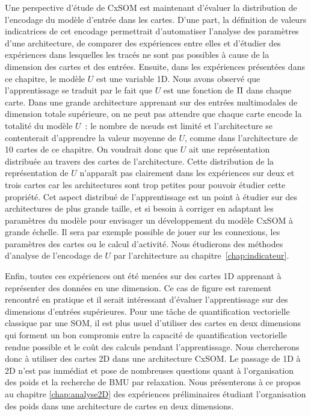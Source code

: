 \documentclass[../main]{subfiles}
\begin{document}
Une perspective d'étude de CxSOM est maintenant d'évaluer la distribution de l'encodage du modèle d'entrée dans les cartes. 
D'une part, la définition de valeurs indicatrices de cet encodage permettrait d'automatiser l'analyse des paramètres d'une architecture, de comparer des expériences entre elles et d'étudier des expériences dans lesquelles les tracés ne sont pas possibles à cause de la dimension des cartes et des entrées.
Ensuite, dans les expériences présentées dans ce chapitre, le modèle $U$ est une variable 1D. 
Nous avons observé que l'apprentissage se traduit par le fait que $U$ est une fonction de $\Pi$ dans chaque carte.
Dans une grande architecture apprenant sur des entrées multimodales de dimension totale supérieure, on ne peut pas attendre que chaque carte encode la totalité du modèle $U$~: le nombre de n\oe{}uds est limité et l'architecture se contenterait d'apprendre la valeur moyenne de $U$, comme dans l'architecture de 10 cartes de ce chapitre.
On voudrait donc que $U$ ait une représentation distribuée au travers des cartes de l'architecture. 
Cette distribution de la représentation de $U$ n'apparaît pas clairement dans les expériences sur deux et trois cartes car les architectures sont trop petites pour pouvoir étudier cette propriété.
Cet aspect distribué de l'apprentissage est un point à étudier sur des architectures de plus grande taille, et si besoin à corriger en adaptant les paramètres du modèle pour envisager un développement du modèle CxSOM à grande échelle. 
Il sera par exemple possible de jouer sur les connexions, les paramètres des cartes ou le calcul d'activité.
Nous étudierons des méthodes d'analyse de l'encodage de $U$ par l'architecture au chapitre~\ref{chap:indicateur}.

Enfin, toutes ces expériences ont été menées sur des cartes 1D apprenant à représenter des données en une dimension. Ce cas de figure est rarement rencontré en pratique et il serait intéressant d'évaluer l'apprentissage sur des dimensions d'entrées supérieures. Pour une tâche de quantification vectorielle classique par une SOM, il est plus usuel d'utiliser des cartes en deux dimensions qui forment un bon compromis entre la capacité de quantification vectorielle rendue possible et le coût des calculs pendant l'apprentissage. Nous chercherons donc à utiliser des cartes 2D dans une architecture CxSOM. Le passage de 1D à 2D n'est pas immédiat et pose de nombreuses questions quant à l'organisation des poids et la recherche de BMU par relaxation. 
Nous présenterons à ce propos au chapitre \ref{chap:analyse2D} des expériences préliminaires étudiant l'organisation des poids dans une architecture de cartes en deux dimensions.

\ifSubfilesClassLoaded{
    \printbibliography
}{}
\end{document}

